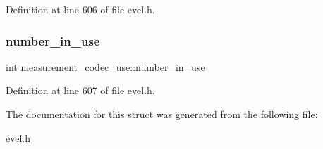 Definition at line 606 of file evel.\+h.

\hypertarget{structmeasurement__codec__use_a3f85bcdaf82c4b32b34b4a915673e31d}{}\label{structmeasurement__codec__use_a3f85bcdaf82c4b32b34b4a915673e31d} 
\subsubsection{\texorpdfstring{number\+\_\+in\+\_\+use}{number\_in\_use}}
{\footnotesize\ttfamily int measurement\+\_\+codec\+\_\+use\+::number\+\_\+in\+\_\+use}



Definition at line 607 of file evel.\+h.



The documentation for this struct was generated from the following file\+:\begin{DoxyCompactItemize}
\item 
\hyperlink{evel_8h}{evel.\+h}\end{DoxyCompactItemize}
